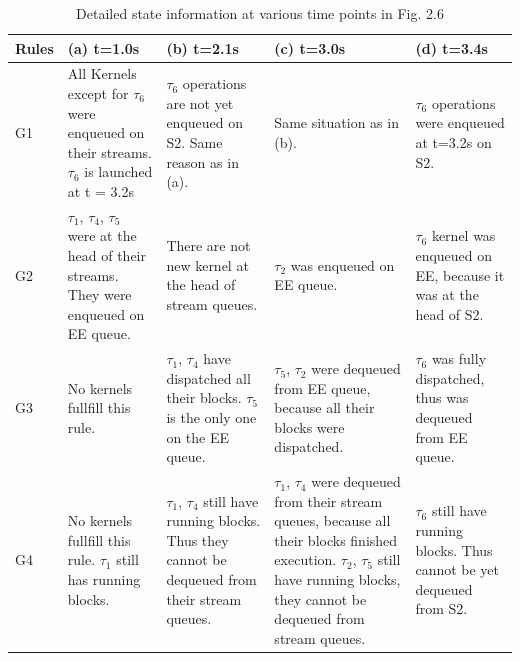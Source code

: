 \documentclass[
  12pt,
  a4paperpaper,
]{report}
\begin{document}
\begin{table}[hbtp]
\small
\begin{tabularx}{\linewidth}{|X|X|X|X|X|}
    \hline
Rules & (a) t=1.0s & (b) t=2.1s & (c) t=3.0s & (d) t=3.4s \\ \hline
G1 & All Kernels except for \(\tau_6\) were enqueued on their streams. \(\tau_6\) is launched at t = 3.2s & \(\tau_6\) operations are not yet enqueued on  S2. Same reason as in (a). & Same situation as in (b). & \(\tau_6\) operations were enqueued at t=3.2s on S2. \\ \hline
G2 & \(\tau_1\), \(\tau_4\), \(\tau_5\) were at the head of their streams. They were enqueued on EE queue. & There are not new kernel at the head of stream queues. & \(\tau_2\) was enqueued on EE queue. & \(\tau_6\) kernel was enqueued on EE, because it was at the head of S2. \\ \hline
G3 & No kernels fullfill this rule. & \(\tau_1\), \(\tau_4\) have dispatched all their blocks. \(\tau_5\) is the only one on the EE queue. & \(\tau_5\), \(\tau_2\) were dequeued from EE queue, because all their blocks were dispatched.  & \(\tau_6\) was fully dispatched, thus was dequeued from EE queue. \\ \hline
G4 & No kernels fullfill this rule. \(\tau_1\) still has running blocks. & \(\tau_1\), \(\tau_4\) still have running blocks. Thus they cannot be dequeued from their stream queues. & \(\tau_1\), \(\tau_4\) were dequeued from their stream queues, because all their blocks finished execution. \(\tau_2\), \(\tau_5\) still have running blocks, they cannot be dequeued from stream queues. & \(\tau_6\) still have running blocks. Thus cannot be yet dequeued from S2. \\ \hline
\end{tabularx}
\label{tab:scheduler_rules1}
\caption{Detailed state information at various time points in Fig. 2.6}
\end{table}
\end{document}
